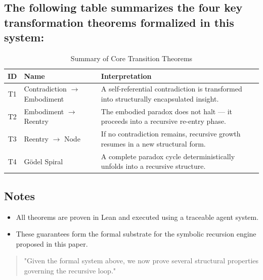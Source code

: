 \documentclass[manuscript,nonacm]{acmart}
\begin{document}
\subsection{The following table summarizes the four key transformation theorems formalized in this system:}
\begin{table}[H]
  \caption{Summary of Core Transition Theorems}
  \label{tab:theorem-summary}
  \begin{tabular}{@{}clp{10cm}@{}}
    \toprule
    \textbf{ID} & \textbf{Name} & \textbf{Interpretation} \\
    \midrule
    T1 & Contradiction $\rightarrow$ Embodiment & A self-referential contradiction is transformed into structurally encapsulated insight. \\
    T2 & Embodiment $\rightarrow$ Reentry & The embodied paradox does not halt — it proceeds into a recursive re-entry phase. \\
    T3 & Reentry $\rightarrow$ Node & If no contradiction remains, recursive growth resumes in a new structural form. \\
    T4 & Gödel Spiral & A complete paradox cycle deterministically unfolds into a recursive structure. \\
    \bottomrule
  \end{tabular}
\end{table}

\subsection{Notes}

\begin{itemize}
\item All theorems are proven in Lean and executed using a traceable agent system.
\item These guarantees form the formal substrate for the symbolic recursion engine proposed in this paper.
\end{itemize}

\begin{quote}
"Given the formal system above, we now prove several structural properties governing the recursive loop."
\end{quote}
\end{document}
